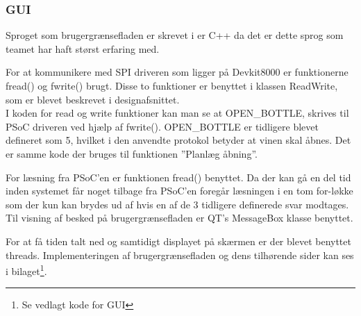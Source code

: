 \subsubsection{GUI}
Sproget som brugergrænsefladen er skrevet i er C++ da det er dette sprog som teamet har haft størst erfaring med.

For at kommunikere med SPI driveren som ligger på Devkit8000 er funktionerne fread() og fwrite() brugt. Disse to funktioner er benyttet i klassen ReadWrite, som er blevet beskrevet i designafsnittet.\\

I koden for read og write funktioner kan man se at OPEN\_BOTTLE, skrives til PSoC driveren ved hjælp af fwrite(). OPEN\_BOTTLE er tidligere blevet defineret som 5, hvilket i den anvendte protokol betyder at vinen skal åbnes. Det er samme kode der bruges til funktionen ”Planlæg åbning”. 

For læsning fra PSoC'en er funktionen fread() benyttet. Da der kan gå en del tid inden systemet får noget tilbage fra PSoC'en foregår læsningen i en tom for-løkke som der kun kan brydes ud af hvis en af de 3 tidligere definerede svar modtages. Til visning af besked på brugergrænsefladen er QT's MessageBox klasse benyttet. 

For at få tiden talt ned og samtidigt displayet på skærmen er der blevet benyttet threads. Implementeringen af brugergrænsefladen og dens tilhørende sider kan ses i bilaget\footnote{Se vedlagt kode for GUI}.

